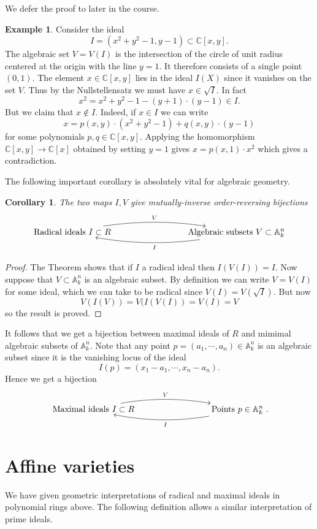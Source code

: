 \documentclass [12pt,oneside,a4paper,mathscr]{amsart}
\newtheorem{cor}[thm]{Corollary}
\theoremstyle{definition}
\newtheorem{example}[thm]{Example}
\newcommand {\A}{\mathbb A}
\newcommand {\C}{\mathbb C}
\begin{document}
We defer the proof to later in the course.

\begin{example}
Consider the ideal \[I=(x^2+y^2-1,y-1)\subset \C[x,y].\]
The algebraic set $V=V(I)$ is the intersection of the circle of unit radius centered at the origin with the line $y=1$. It therefore consists of a single point $(0,1)$.
 The element $x\in \C[x,y]$ lies in the ideal $I(X)$ since it vanishes on the set $V$. Thus by the Nullstellensatz we must have $x\in \sqrt{I}$. In fact
\[x^2=x^2+y^2-1 - (y+1)\cdot (y-1)   \in I.\]
But we claim that $x\notin I$. Indeed, if $x\in I$ we can  write
\[
x=p(x,y) \cdot (x^2+y^2-1) + q(x,y)\cdot (y-1)\]
for some polynomials $p,q\in \C[x,y]$. Applying the homomorphism $\C[x,y]\to \C[x]$ obtained by setting $y=1$ gives
$x=p(x,1)\cdot x^2$ which gives a contradiction. 
\end{example}

 The following important corollary is absolutely vital for algebraic geometry.

\begin{cor}
\label{cor}
The  two maps $I,V$  give mutually-inverse  order-reversing bijections
\[\xymatrix{ {\text{Radical ideals }I\subset R} \ar@/^1pc/[rrr]^{V} &&& {\text{Algebraic subsets }V\subset \A^n_k} \ar@/^1pc/[lll]^{I}}\]
\end{cor}

\begin{proof}
 The Theorem shows that if  $I$ a radical ideal then $I(V(I))=I$. Now suppose that $V\subset \A^n_k$ is an algebraic subset. By definition we can write $V=V(I)$ for some ideal, which we can take to be radical since $V(I)=V(\sqrt{I})$. But now \[V(I(V))=V(I(V(I))=V(I)=V\]
so the result is proved.
\end{proof}

It follows that we get a bijection between maximal ideals of $R$ and mimimal algebraic subsets of $\A^n_k$. Note that any point $p=(a_1,\cdots, a_n)\in \A^n_k$ is an algebraic subset since it is the vanishing locus of the ideal
\[I(p)=(x_1-a_1, \cdots, x_n-a_n).\]
Hence we get a bijection
\[\xymatrix{ {\text{Maximal ideals }I\subset R} \ar@/^1pc/[rrr]^{V} &&& {\text{Points }p\in  \A^n_k} \ar@/^1pc/[lll]^{I}}.\]



\section{Affine varieties}
We have given geometric interpretations of radical and maximal ideals in polynomial rings above. The following definition allows a similar interpretation of prime ideals.
\end{document}
